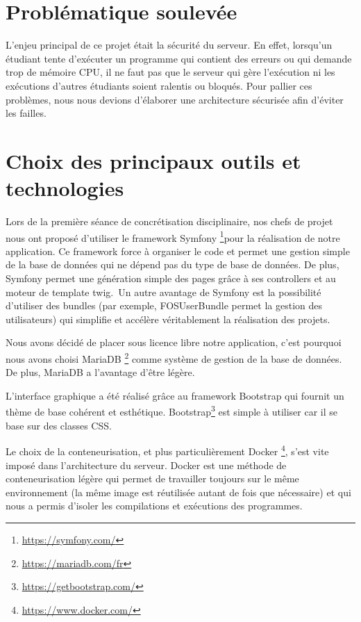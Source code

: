 \section{Problématique soulevée}

\par L'enjeu principal de ce projet était la sécurité du serveur. En effet, lorsqu'un étudiant tente d'exécuter un programme qui contient des erreurs ou qui demande trop de mémoire CPU, il ne faut pas que le serveur qui gère l'exécution ni les exécutions d'autres étudiants soient ralentis ou bloqués. Pour pallier ces problèmes, nous nous devions d'élaborer une architecture sécurisée afin d'éviter les failles.


\section{Choix des principaux outils et technologies}

\par Lors de la première séance de concrétisation disciplinaire, nos chefs de projet nous ont proposé d'utiliser le framework Symfony \footnote{\url{https://symfony.com/}}pour la réalisation de notre application. Ce framework force à organiser le code et permet une gestion simple de la base de données qui ne dépend pas du type de base de données. De plus, Symfony permet une génération simple des pages grâce à ses controllers et au moteur de template twig.\
Un autre avantage de Symfony est la possibilité d'utiliser des bundles (par exemple, FOSUserBundle permet la gestion des utilisateurs) qui simplifie et accélère véritablement la réalisation des projets. \\

\par Nous avons décidé de placer sous licence libre notre application, c'est pourquoi nous avons choisi MariaDB \footnote{\url{https://mariadb.com/fr}} comme système de gestion de la base de données. De plus, MariaDB a l'avantage d'être légère. \\

\par L'interface graphique a été réalisé grâce au framework Bootstrap qui fournit un thème de base cohérent et esthétique. Bootstrap\footnote{\url{https://getbootstrap.com/}} est simple à utiliser car il se base sur des classes CSS. \\

\par Le choix de la conteneurisation, et plus particulièrement Docker \footnote{\url{https://www.docker.com/}}, s'est vite imposé dans l'architecture du serveur. Docker est une méthode de conteneurisation légère qui permet de travailler toujours sur le même environnement (la même image est réutilisée autant de fois que nécessaire) et qui nous a permis d'isoler les compilations et exécutions des programmes.

